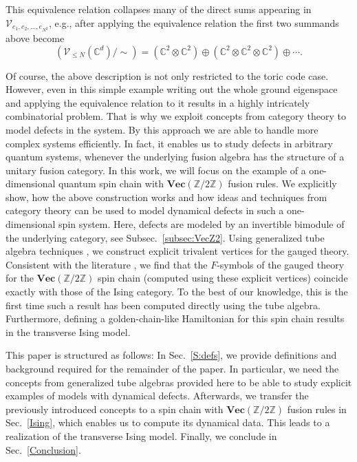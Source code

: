 \documentclass[aps,prb,twocolumn,superscriptaddress,noshowkeys]{revtex4-2}  %
\renewcommand{\Vec}{\textbf{Vec}}
\newcommand{\Z}{\mathbb{Z}}
\theoremstyle{plain}%
\theoremstyle{definition}
\theoremstyle{remark}
\begin{document}
This equivalence relation collapses many of the direct sums appearing in $\mathcal{V}_{e_1,e_2,\ldots,e_{N^2}}$, e.g., after applying the equivalence relation the first two summands above become
\begin{equation}
\left(\mathcal{V}_{\le N}(\mathbb{C}^d)/\sim\right) = (\mathbb{C}^2\otimes \mathbb{C}^2)\oplus (\mathbb{C}^2\otimes \mathbb{C}^2\otimes \mathbb{C}^2)\oplus \cdots.
\end{equation}

Of course, the above description is not only restricted to the toric code case. However, even in this simple example writing out the whole ground eigenspace and applying the equivalence relation to it results in a highly intricately combinatorial problem. That is why we exploit concepts from category theory to model defects in the system. By this approach we are able to handle more complex systems efficiently. In fact, it enables us to study defects in arbitrary quantum systems, whenever the underlying fusion algebra has the structure of a unitary fusion category. In this work, we will focus on the example of a one-dimensional quantum spin chain with $\Vec(\Z/2\Z)$ fusion rules. We explicitly show, how the above construction works and how ideas and techniques from category theory can be used to model dynamical defects in such a one-dimensional spin system. Here, defects are modeled by an invertible bimodule of the underlying category, see Subsec.~\ref{subsec:VecZ2}. Using generalized tube algebra techniques \cite{ocneanu}, we construct explicit trivalent vertices for the gauged theory. Consistent with the literature \cite{TY,ENO10,Bombin2010,BBCW14,WBV17}, we find that the $F$-symbols of the gauged theory for the $\Vec(\Z/2\Z)$ spin chain (computed using these explicit vertices) coincide exactly with those of the Ising category. To the best of our knowledge, this is the first time such a result has been computed directly using the tube algebra. Furthermore, defining a golden-chain-like Hamiltonian \cite{Feiguin2007} for this spin chain results in the transverse Ising model.

This paper is structured as follows: In Sec.~\ref{S:defs}, we provide definitions and background required for the remainder of the paper. In particular, we need the concepts from generalized tube algebras provided here to be able to study explicit examples of models with dynamical defects. Afterwards, we transfer the previously introduced concepts to a spin chain with $\Vec(\Z/2\Z)$ fusion rules in Sec.~\ref{Ising}, which enables us to compute its dynamical data. This leads to a realization of the transverse Ising model. Finally, we conclude in Sec.~\ref{Conclusion}.
\end{document}
